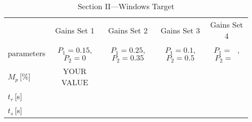 \documentclass{article}
\begin{document}
\begin{table}[phtb]\footnotesize \label{tbl:lab5_q1_3}
\begin{center}
\caption{Section II---Windows Target}
\begin{tabular}{l|m{1.2cm}|m{1.2cm}|m{1.2cm}|m{1.2cm}|m{1.2cm}|m{1.2cm}|m{1.2cm}|m{1.2cm}} \hline \hline
\cellcolor{lightgray} & \multicolumn{2}{c|}{\cellcolor{lightgray}Gains Set 1} & \multicolumn{2}{c|}{\cellcolor{lightgray}Gains Set 2} & \multicolumn{2}{c|}{\cellcolor{lightgray}Gains Set 3} & \multicolumn{2}{c}{\cellcolor{lightgray}Gains Set 4}\\ \cline{2-9}
\multirow{-2}{*}{\cellcolor{lightgray}parameters}& \multicolumn{2}{c|}{$P_1 = 0.15$, $P_2 = 0$}& \multicolumn{2}{c|}{$P_1 = 0.25$, $P_2 = 0.35$}& \multicolumn{2}{c|}{$P_1 = 0.1$, $P_2 = 0.5$}& \multicolumn{2}{c}{$P_1 = ~~~$, $P_2 = ~~~$}\\ \hline
$M_p$\,[\%]& \multicolumn{2}{c|}{YOUR VALUE} & \multicolumn{2}{c|}{~} & \multicolumn{2}{c|}{~} & \multicolumn{2}{c}{~} \\ \hline
$t_r$\,[\si{\second}] & \multicolumn{2}{c|}{} & \multicolumn{2}{c|}{} & \multicolumn{2}{c|}{} & \multicolumn{2}{c}{} \\ \hline
$t_s$\,[\si{\second}] & \multicolumn{2}{c|}{} & \multicolumn{2}{c|}{} & \multicolumn{2}{c|}{} & \multicolumn{2}{c}{} \\ \hline
\end{tabular}
\end{center}
\end{table}
\end{document}
